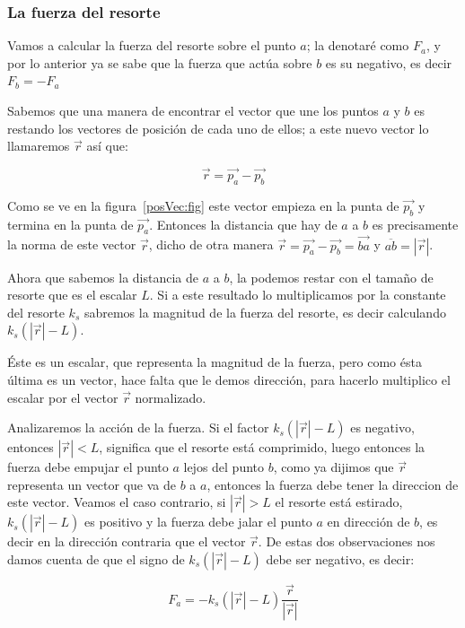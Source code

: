\subsubsection{La fuerza del resorte}

Vamos a calcular la fuerza del resorte sobre el punto $a$; la denotaré como $F_a$, y por lo anterior ya se sabe que la fuerza que actúa sobre $b$ es su negativo, es decir $F_b = -F_a$

Sabemos que una manera de encontrar el vector que une los puntos $a$ y $b$ es restando los vectores de posición de cada uno de ellos; a este nuevo vector lo llamaremos $\vec{r}$ así que:

\begin{equation}
\vec{r} = \vec{p_a} - \vec{p_b}
\end{equation}

Como se ve en la figura~\ref{posVec:fig} este vector empieza en la punta de $\vec{p_b}$ y termina en la punta de $\vec{p_a}$. Entonces la distancia que hay de $a$ a $b$ es precisamente la norma de este vector $\vec{r}$, dicho de otra manera $\vec{r} = \vec{p_a} - \vec{p_b} = \vec{ba}$ y $\overline{ab} = |\vec{r}|$.

Ahora que sabemos la distancia de $a$ a $b$, la podemos restar con el tamaño de resorte que es el escalar $L$. Si a este resultado lo multiplicamos por la constante del resorte $k_s$ sabremos la magnitud de la fuerza del resorte, es decir calculando $k_s \left( |\vec{r}| - L \right)$.

Éste es un escalar, que representa la magnitud de la fuerza, pero como ésta última es un vector, hace falta que le demos dirección, para hacerlo multiplico el escalar por el vector $\vec{r}$ normalizado.

Analizaremos la acción de la fuerza. Si el factor $k_s \left( |\vec{r}| - L \right)$ es negativo, entonces $| \vec{r} | < L$, significa que el resorte está comprimido, luego entonces la fuerza debe empujar el punto $a$ lejos del punto $b$, como ya dijimos que $\vec{r}$ representa un vector que va de $b$ a $a$, entonces la fuerza debe tener la direccion de este vector. Veamos el caso contrario, si $ | \vec{r} | > L $ el resorte está estirado, $k_s \left( |\vec{r}| - L \right)$ es positivo y la fuerza debe jalar el punto $a$ en dirección de $b$, es decir en la dirección contraria que el vector $\vec{r}$. De estas dos observaciones nos damos cuenta de que el signo de $k_s \left( |\vec{r}| - L \right)$ debe ser negativo, es decir:

\begin{equation}
\label{fuerza:resorte}
F_a = -k_s \left( |\vec{r}| - L \right) \frac{\vec{r}}{|\vec{r}|}
\end{equation}

